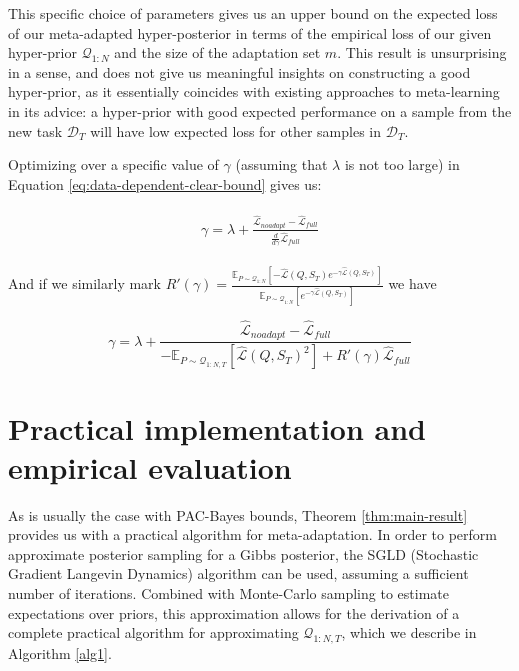\documentclass{article}
\theoremstyle{definition}
\newcommand{\Expect}[2]{\mathbb{E}_{#1}\left [#2 \right ]}
\begin{document}
This specific choice of parameters gives us an upper bound on the expected loss of our meta-adapted hyper-posterior in terms of the empirical loss of our given hyper-prior $\mathcal{Q}_{1:N}$ and the size of the adaptation set $m$. This result is unsurprising in a sense, and does not give us meaningful insights on constructing a good hyper-prior, as it essentially coincides with existing approaches to meta-learning in its advice: a hyper-prior with good expected performance on a sample from the new task $\mathcal{D}_T$ will have low expected loss for other samples in $\mathcal{D}_T$.

Optimizing over a specific value of $\gamma$ (assuming that $\lambda$ is not too large) in Equation \ref{eq:data-dependent-clear-bound} gives us:

\begin{align} \label{eq:gamma-data-depend}
\begin{split}
\gamma = \lambda + \frac{\hat{\mathcal{L}}_{noadapt}-\hat{\mathcal{L}}_{full}}{\frac{d}{d\gamma}\hat{\mathcal{L}}_{full}}
\end{split}
\end{align}

And if we similarly mark $R'(\gamma)=\frac{\Expect{P\sim \mathcal{Q}_{1:N}}{-\hat{\mathcal{L}}(Q,S_T)e^{-\gamma\hat{\mathcal{L}}(Q,S_T)} }}{\Expect{P\sim \mathcal{Q}_{1:N}}{e^{-\gamma\hat{\mathcal{L}}(Q,S_T)}} }$ we have

$$\gamma = \lambda + \frac{\hat{\mathcal{L}}_{noadapt}-\hat{\mathcal{L}}_{full}}{-\Expect{P\sim \mathcal{Q}_{1:N,T}}{\hat{\mathcal{L}}(Q, S_T)^2}+R'(\gamma)\hat{\mathcal{L}}_{full}}
$$

\section{Practical implementation and empirical evaluation}

As is usually the case with PAC-Bayes bounds, Theorem \ref{thm:main-result} provides us with a practical algorithm for meta-adaptation. In order to perform approximate posterior sampling for a Gibbs posterior, the SGLD (Stochastic Gradient Langevin Dynamics) algorithm \citep{Welling2011} can be used, assuming a sufficient number of iterations.
Combined with Monte-Carlo sampling to estimate expectations over priors, 
this approximation allows for the derivation of a complete practical algorithm for approximating $\mathcal{Q}_{1:N,T}$, which we describe in Algorithm \ref{alg1}.
\end{document}
